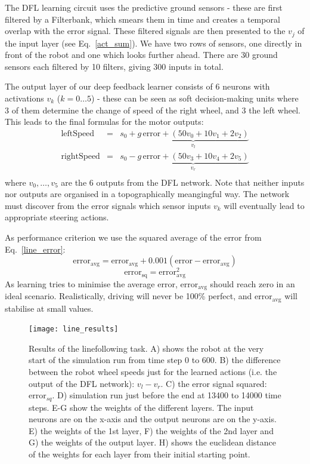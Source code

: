 \documentclass{llncs}
\begin{document}
The DFL learning circuit uses the predictive ground sensors - these are first filtered by a Filterbank, which smears them in time and creates a temporal overlap with the error signal. These filtered signals are then presented to the  $v_j$ of the input layer (see
Eq.~\ref{act_sum}). We have two rows of sensors,
one directly in front of the robot and one which looks further ahead. There are 30 ground sensors each filtered by 10 filters, giving 300 inputs in total. 

The output layer of our deep feedback learner consists of 6 neurons
with activations $v_k$ ($k=0 \ldots 5$) - these can be seen as soft
decision-making units where 3 of them determine the change of speed of
the right wheel, and 3 the left wheel. This leads to the
final formulas for the motor outputs:
\begin{eqnarray}
  \mathrm{leftSpeed} &=& s_0 + \underbrace{g\, \mathrm{error} + \left( 50 v_0 + 10 v_1 + 2 v_2 \right)}_{v_l} \\
  \mathrm{rightSpeed} &=& s_0 - \underbrace{g\, \mathrm{error} + \left( 50 v_3 + 10 v_4 + 2 v_5 \right)}_{v_r} \\
\end{eqnarray}
where $v_0, \ldots, v_5$ are the 6 outputs from the DFL network. Note
that neither inputs nor outputs are organised in a topographically
meangingful way. The network must discover from the error signals
which sensor inputs $v_k$ will eventually lead to appropriate steering
actions.

As performance criterion we use the squared average of the error from
Eq.~\ref{line_error}:
\begin{equation}
  \mathrm{error}_\mathrm{avg} =  \mathrm{error}_\mathrm{avg} + 0.001 (\mathrm{error} - \mathrm{error}_\mathrm{avg}) 
\end{equation}
\begin{equation}
  \mathrm{error}_\mathrm{sq} =  \mathrm{error}_\mathrm{avg}^2 \label{line_sqerr}
\end{equation}
As learning tries to minimise the average error, $\mathrm{error}_\mathrm{avg}$ should reach zero in an ideal
scenario. Realistically, driving will never be 100\% perfect, and $\mathrm{error}_\mathrm{avg}$
will stabilise at small values.


\begin{figure}[h!]
  \centering
  \texttt{[image: line\_results]}
  \caption{Results of the linefollowing task. A) shows the robot at
    the very start of the simulation run from time step 0 to 600.
    B) the difference between the robot wheel speeds just for the learned
    actions (i.e. the output of the DFL network): $v_l-v_r$.
    C) the error signal squared: $\mathrm{error}_{sq}$.
    D) simulation run just before the end at 13400 to 14000 time steps.
    E-G show the weights of the different layers. The input neurons are on the x-axis
    and the output neurons are on the y-axis.
    E) the weights of the 1st layer, F) the weights of the 2nd layer and
    G) the weights of the output layer.
        H) shows the euclidean distance of the weights for each layer from their initial starting point.
    \label{line_results}}
\end{figure}
\end{document}
